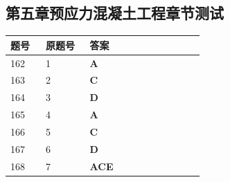 \documentclass[UTF8,fontset=windows,11pt]{ctexart}
\begin{document}
\vspace{0.4em}
\subsection*{第五章预应力混凝土工程章节测试}
\begin{longtable}{p{0.16\linewidth}p{0.2\linewidth}p{0.52\linewidth}}
\textbf{\textcolor{examnavy}{题号}} & \textbf{\textcolor{examnavy}{原题号}} & \textbf{\textcolor{answergreen}{答案}} \\
\hline
162 & 1 & \textbf{\textcolor{answergreen}{A}} \\
163 & 2 & \textbf{\textcolor{answergreen}{C}} \\
164 & 3 & \textbf{\textcolor{answergreen}{D}} \\
165 & 4 & \textbf{\textcolor{answergreen}{A}} \\
166 & 5 & \textbf{\textcolor{answergreen}{C}} \\
167 & 6 & \textbf{\textcolor{answergreen}{D}} \\
168 & 7 & \textbf{\textcolor{answergreen}{ACE}} \\
\end{longtable}
\vspace{0.4em}
\end{document}
